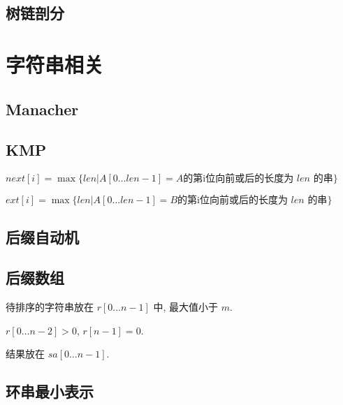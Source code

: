 \documentclass[landscape, twocolumn, 8pt, a4paper, twoside]{extarticle}
\begin{document}
  \subsection{树链剖分}
    

\section{字符串相关}
  \subsection{Manacher}
    

  \subsection{KMP}
    $next[i] = \max\{len | A[0 \ldots len - 1] = A \textrm{的第i位向前或后的长度为 $len$ 的串} \}$

    $ext[i] = \max\{len | A[0 \ldots len - 1] = B \textrm{的第i位向前或后的长度为 $len$ 的串} \}$
    

%    

  \subsection{后缀自动机}
    

  \subsection{后缀数组}
    待排序的字符串放在 $r[0 \ldots n - 1]$ 中, 最大值小于 $m$.
    
    $r[0 \ldots n - 2] > 0$, $r[n - 1] = 0$.
    
    结果放在 $sa[0 \ldots n - 1]$.
    
  
  \subsection{环串最小表示}
    
\end{document}
